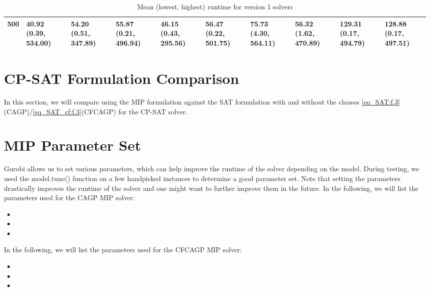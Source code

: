 \begin{table}
\begin{tabular}{l|l|l|l|l|l|l|l|l|l}
500 & \makecell{40.92\\(0.39, 534.00)} & \makecell{54.20\\(0.51, 347.89)} & \makecell{55.87\\(0.21, 496.94)} & \makecell{46.15\\(0.43, 295.56)} & \makecell{56.47\\(0.22, 501.75)} & \makecell{75.73\\(4.30, 564.11)} & \makecell{56.32\\(1.62, 470.89)} & \makecell{129.31\\(0.17, 494.79)} & \makecell{128.88\\(0.17, 497.51)} \\
\bottomrule
\end{tabular}
\caption{Mean (lowest, highest) runtime for version 1 solvers}
\label{tab:mean_low_high_SAT_ver1}
\end{table}

\section{CP-SAT Formulation Comparison}
In this section, we will compare using the MIP formulation against the SAT formulation with and without the clauses \cref{eq_SAT:f.3}(CAGP)/\cref{eq_SAT_cf:f.3}(CFCAGP) for the CP-SAT solver. 

\section{MIP Parameter Set}
Gurobi allows us to set various parameters, which can help improve the runtime of the solver depending on the model. During testing, we used the model.tune() function on a few handpicked instances to determine a good parameter set. Note that setting the parameters drastically improves the runtime of the solver and one might want to further improve them in the future. In the following, we will list the parameters used for the CAGP MIP solver:
\begin{itemize}
  \item 
  \item 
  \item 
\end{itemize}
In the following, we will list the parameters used for the CFCAGP MIP solver:
\begin{itemize}
  \item 
  \item 
  \item 
\end{itemize}

